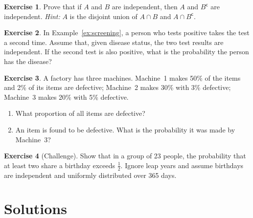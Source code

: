 \documentclass[11pt,letterpaper]{article}
\theoremstyle{definition}
\newtheorem{exercise}{Exercise}
\theoremstyle{plain}
\newcommand{\comp}{^{\mathsf{c}}}
\begin{document}
\begin{exercise}\label{ex:complement}
Prove that if $A$ and $B$ are independent, then $A$ and $B\comp$ are independent. \emph{Hint:} $A$ is the disjoint union of $A \cap B$ and $A \cap B\comp$.
\end{exercise}

\begin{exercise}
In Example~\ref{ex:screening}, a person who tests positive takes the test a second time. Assume that, given disease status, the two test results are independent. If the second test is also positive, what is the probability the person has the disease?
\end{exercise}

\begin{exercise}
A factory has three machines. Machine~1 makes 50\% of the items and 2\% of its items are defective; Machine~2 makes 30\% with 3\% defective; Machine~3 makes 20\% with 5\% defective.
\begin{enumerate}[label=(\alph*), nosep]
  \item What proportion of all items are defective?
  \item An item is found to be defective. What is the probability it was made by Machine~3?
\end{enumerate}
\end{exercise}

\begin{exercise}[Challenge]
Show that in a group of 23 people, the probability that at least two share a birthday exceeds $\frac12$. Ignore leap years and assume birthdays are independent and uniformly distributed over 365 days.
\end{exercise}

\newpage
\section*{Solutions}
\end{document}
